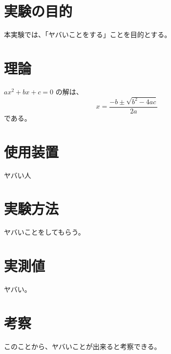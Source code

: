 \documentclass{jlreq}
\begin{document}
\section{実験の目的}
本実験では、「ヤバいことをする」ことを目的とする。
\section{理論}
$ax^2+bx+c=0$ の解は、
\[
    x=\frac{-b\pm\sqrt{b^2-4ac}}{2a}
\]
である。
\section{使用装置}
ヤバい人
\section{実験方法}
ヤバいことをしてもらう。
\section{実測値}
ヤバい。
\section{考察}
このことから、ヤバいことが出来ると考察できる。
\end{document}
